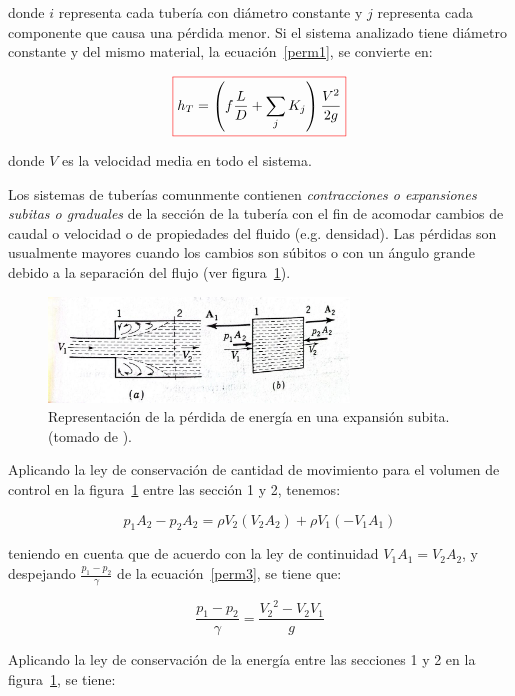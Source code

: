 \documentclass[11pt, oneside]{article}
\begin{document}
donde $i$ representa cada tuber\'ia con di\'ametro constante y $j$ representa cada componente que causa una p\'erdida menor. Si el sistema analizado tiene di\'ametro constante y del mismo material, la ecuaci\'on~\ref{perm1}, se convierte en:

\begin{equation}
\color{red}\boxed{\color{black} h_T = \left( f \frac{L }{D} + \sum_{j} K_j \right) \frac{V^2}{2g} }
\label{perm2}
\end{equation}

donde $V$ es la velocidad media en todo el sistema. 

Los sistemas de tuber\'ias comunmente contienen \emph{contracciones o expansiones subitas o graduales} de la secci\'on de la tuber\'ia con el fin de acomodar cambios de caudal o velocidad o de propiedades del fluido (e.g. densidad). Las p\'erdidas son usualmente mayores cuando los cambios son s\'ubitos o con un \'angulo grande debido a la separaci\'on del flujo (ver figura~\ref{acce2}).

\begin{figure}[h]
\centering
\includegraphics[width=8cm]{acce2.jpeg}
\caption{Representaci\'on de la p\'erdida de energ\'ia en una expansi\'on subita. (tomado de \cite{streeter}).}
\label{acce2}
\end{figure}

Aplicando la ley de conservaci\'on de cantidad de movimiento para el volumen de control en la figura~\ref{acce2} entre las secci\'on 1 y 2, tenemos:

\begin{equation}
p_1 A_2 - p_2 A_2 = \rho V_2 (V_2 A_2) + \rho V_1 (-V_1 A_1 )
\label{perm3}
\end{equation}

teniendo en cuenta que de acuerdo con la ley de continuidad $V_1 A_1 = V_2 A_2$, y despejando $\frac{p_1 - p_2}{\gamma}$ de la ecuaci\'on~\ref{perm3}, se tiene que:

\begin{equation}
\frac{p_1 - p_2}{\gamma} =  \frac{{V_2}^2 - V_2 V_1}{g}
\label{perm4}
\end{equation}

Aplicando la ley de conservaci\'on de la energ\'ia entre las secciones 1 y 2 en la figura~\ref{acce2}, se tiene:
\end{document}
